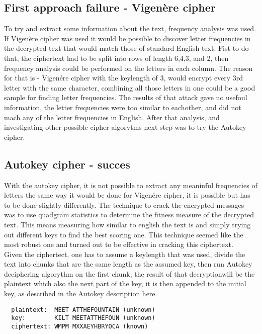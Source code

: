 \documentclass[12pt]{report}
\begin{document}
\subsection*{First approach failure - Vigenère cipher}
To try and extract some information about the text, frequency analysis was used. If Vigenère cipher was used it would be possible to discover letter frequencies in the decrypted text that would match those of standard English text\cite{viganal}. Fist to do that, the ciphertext had to be split into rows of length 6,4,3, and 2, then frequency analysis could be performed on the letters in each column. The reason for that is - Vigenére cipher with the keylength of 3, would encrypt every 3rd letter with the same character, combining all those letters in one could be a good sample for finding letter frequencies. The results of that attack gave no usefoul information, the letter frequencies were too similar to eachother, and did not mach any of the letter frequencies in English\cite{engletfreq}. After that analysis, and investigating other possible cipher algorytms next step was to try the Autokey cipher.

\subsection*{Autokey cipher - succes}
With the autokey cipher, it is not possible to extract any meaninful frequencies of letters the same way it would be done for Vigenére cipher, it is possible but has to be done slightly differently. The technique to crack the encrypted messages was to use quadgram statistics to determine the fitness measure of the decrypted text. This means measuring how similar to english the text is and simply trying out different keys to find the best scoring one. This technique seemed like the most robust one and turned out to be effective in cracking this ciphertext\cite{quadanal}.\\
Given the ciphertect, one has to assume a keylength that was used, divide the text into chunks that are the same length as the assumed key, then run Autokey deciphering algorythm on the first chunk, the result of that decryptionwill be the plaintext which also the next part of the key, it is then appended to the initial key, as described in the Autokey description here\cite{autokeyc}.
\begin{lstlisting}
  plaintext:  MEET ATTHEFOUNTAIN (unknown)
  key:        KILT MEETATTHEFOUN (unknown)
  ciphertext: WMPM MXXAEYHBRYOCA (known)
\end{lstlisting}
\end{document}
